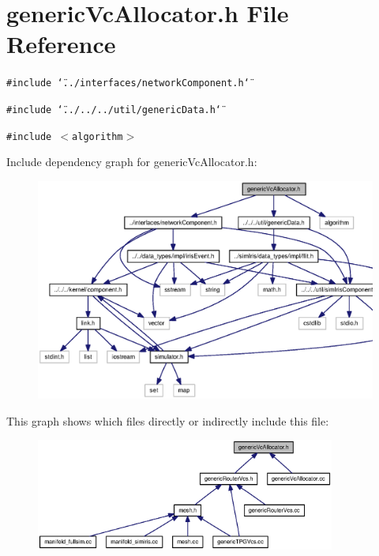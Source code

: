 \section{genericVcAllocator.h File Reference}
\label{genericVcAllocator_8h}
{\tt \#include \char`\"{}../interfaces/networkComponent.h\char`\"{}}\par
{\tt \#include \char`\"{}../../../util/genericData.h\char`\"{}}\par
{\tt \#include $<$algorithm$>$}\par


Include dependency graph for genericVcAllocator.h:\nopagebreak
\begin{figure}[H]
\begin{center}
\leavevmode
\includegraphics[width=339pt]{genericVcAllocator_8h__incl}
\end{center}
\end{figure}


This graph shows which files directly or indirectly include this file:\nopagebreak
\begin{figure}[H]
\begin{center}
\leavevmode
\includegraphics[width=279pt]{genericVcAllocator_8h__dep__incl}
\end{center}
\end{figure}
